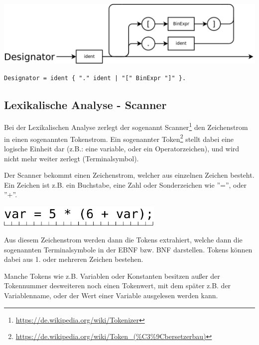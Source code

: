 \includegraphics[width=\textwidth]{./media/images/compiler/ebnf_designator.png}
\begin{lstlisting}[language=EBNF]
Designator = ident { "." ident | "[" BinExpr "]" }.
\end{lstlisting}


\newpage

\subsection{Lexikalische Analyse - Scanner}

Bei der Lexikalischen Analyse zerlegt der sogenannt Scanner\footnote{\url{https://de.wikipedia.org/wiki/Tokenizer}} den Zeichenstrom in einen sogenannten Tokenstrom. Ein sogenannter Token\footnote{\url{https://de.wikipedia.org/wiki/Token_(\%C3\%9Cbersetzerbau)}} stellt dabei eine logische Einheit dar (z.B.: eine variable, oder ein Operatorzeichen), und wird nicht mehr weiter zerlegt (Terminalsymbol).


Der Scanner bekommt einen Zeichenstrom, welcher aus einzelnen Zeichen besteht. Ein Zeichen ist z.B. ein Buchstabe, eine Zahl oder Sonderzeichen wie ''='', oder ''+''.

\includegraphics[width=0.6\textwidth]{./media/images/compiler/input_characterstream.png}


Aus diesem Zeichenstrom werden dann die Tokens extrahiert, welche dann die sogenannten Terminalsymbole in der EBNF bzw. BNF darstellen. Tokens k\"onnen dabei aus 1. oder mehreren Zeichen bestehen.

Manche Tokens wie z.B. Variablen oder Konstanten besitzen au\ss{}er der Tokennummer desweiteren noch einen Tokenwert, mit dem sp\"ater z.B. der Variablenname, oder der Wert einer Variable ausgelesen werden kann.

